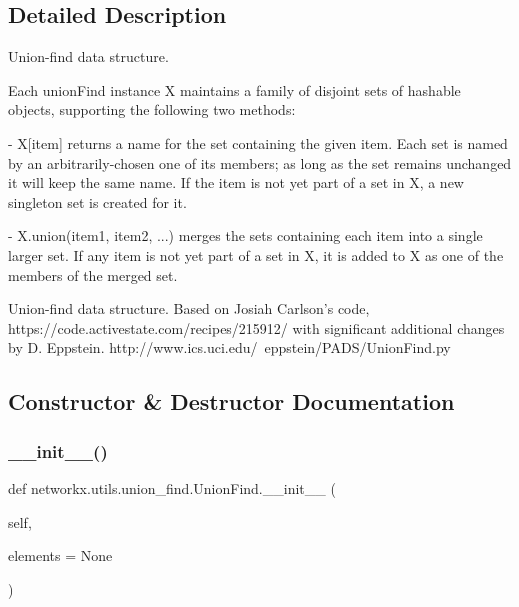 \subsection{Detailed Description}
\begin{DoxyVerb}Union-find data structure.

Each unionFind instance X maintains a family of disjoint sets of
hashable objects, supporting the following two methods:

- X[item] returns a name for the set containing the given item.
  Each set is named by an arbitrarily-chosen one of its members; as
  long as the set remains unchanged it will keep the same name. If
  the item is not yet part of a set in X, a new singleton set is
  created for it.

- X.union(item1, item2, ...) merges the sets containing each item
  into a single larger set.  If any item is not yet part of a set
  in X, it is added to X as one of the members of the merged set.

  Union-find data structure. Based on Josiah Carlson's code,
  https://code.activestate.com/recipes/215912/
  with significant additional changes by D. Eppstein.
  http://www.ics.uci.edu/~eppstein/PADS/UnionFind.py\end{DoxyVerb}
 

\subsection{Constructor \& Destructor Documentation}
\mbox{\label{classnetworkx_1_1utils_1_1union__find_1_1UnionFind_add9e2eefbebb3c65b22d39637720807a}} 
\subsubsection{\texorpdfstring{\+\_\+\+\_\+init\+\_\+\+\_\+()}{\_\_init\_\_()}}
{\footnotesize\ttfamily def networkx.\+utils.\+union\+\_\+find.\+Union\+Find.\+\_\+\+\_\+init\+\_\+\+\_\+ (\begin{DoxyParamCaption}\item[{}]{self,  }\item[{}]{elements = {\ttfamily None} }\end{DoxyParamCaption})}

